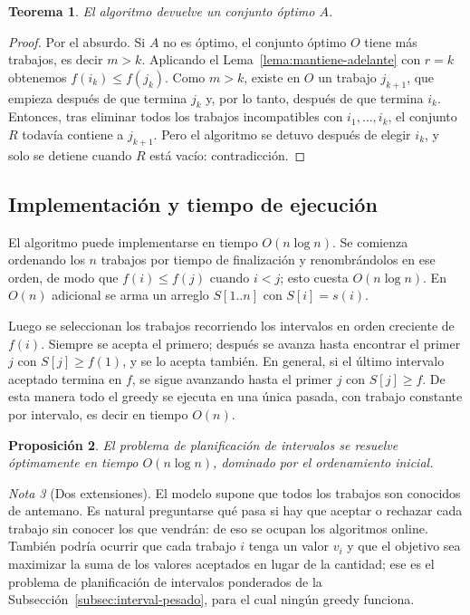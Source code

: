\documentclass[12pt, spanish, oneside, openany]{book}
\theoremstyle{uprightplain}
\newtheorem{teorema}{Teorema}[section]
\newtheorem{proposicion}[teorema]{Proposición}
\theoremstyle{definition}
\theoremstyle{remark}
\newtheorem{nota}[teorema]{Nota}
\theoremstyle{definition}
\begin{document}
\begin{teorema}
\label{teo:greedy-intervalos}
El algoritmo devuelve un conjunto óptimo $A$.
\end{teorema}
\begin{proof}
Por el absurdo. Si $A$ no es óptimo, el conjunto óptimo $O$ tiene más trabajos, es decir $m>k$. Aplicando el Lema~\ref{lema:mantiene-adelante} con $r=k$ obtenemos $f(i_k) \le f(j_k)$. Como $m>k$, existe en $O$ un trabajo $j_{k+1}$, que empieza después de que termina $j_k$ y, por lo tanto, después de que termina $i_k$. Entonces, tras eliminar todos los trabajos incompatibles con $i_1,\dots,i_k$, el conjunto $R$ todavía contiene a $j_{k+1}$. Pero el algoritmo se detuvo después de elegir $i_k$, y solo se detiene cuando $R$ está vacío: contradicción.
\end{proof}

\subsection{Implementación y tiempo de ejecución}

El algoritmo puede implementarse en tiempo $O(n\log n)$. Se comienza ordenando los $n$ trabajos por tiempo de finalización y renombrándolos en ese orden, de modo que $f(i) \le f(j)$ cuando $i<j$; esto cuesta $O(n\log n)$. En $O(n)$ adicional se arma un arreglo $S[1..n]$ con $S[i]=s(i)$.

Luego se seleccionan los trabajos recorriendo los intervalos en orden creciente de $f(i)$. Siempre se acepta el primero; después se avanza hasta encontrar el primer $j$ con $S[j] \ge f(1)$, y se lo acepta también. En general, si el último intervalo aceptado termina en $f$, se sigue avanzando hasta el primer $j$ con $S[j] \ge f$. De esta manera todo el greedy se ejecuta en una única pasada, con trabajo constante por intervalo, es decir en tiempo $O(n)$.

\begin{proposicion}
\label{prop:tiempo-intervalos}
El problema de planificación de intervalos se resuelve óptimamente en tiempo $O(n\log n)$, dominado por el ordenamiento inicial.
\end{proposicion}

\begin{nota}[Dos extensiones]
El modelo supone que todos los trabajos son conocidos de antemano. Es natural preguntarse qué pasa si hay que aceptar o rechazar cada trabajo sin conocer los que vendrán: de eso se ocupan los algoritmos online. También podría ocurrir que cada trabajo $i$ tenga un valor $v_i$ y que el objetivo sea maximizar la suma de los valores aceptados en lugar de la cantidad; ese es el problema de planificación de intervalos ponderados de la Subsección~\ref{subsec:interval-pesado}, para el cual ningún greedy funciona.
\end{nota}
\end{document}
